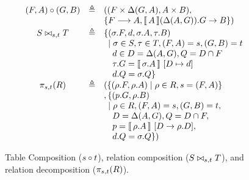 \begin{figure}[tpb]
  \[\begin{array}{ccl}
      \compose{(F,A)}{(G,B)}
      & \triangleq
      & ((F\times\Delta(G,A), A\times B),\\
      &&\{F \longrightarrow A, \bracbb{A}(\Delta(A,G)).G \to B \})\\[.2em]
      \relcomp{s}{t}{S}{T}
      & \triangleq
      & \{(\sigma.F,d,\sigma.A,\tau.B) \\
      && \hspace{.5em}
         \mid \sigma \in S, \tau \in T, (F,A) = s, (G,B) = t \\
      && \hspace{1em}
         d \in D = \Delta(A, G), Q = D \cap F\\
      && \hspace{1em}
         \tau.G = \bracbb{\sigma.A}~[D \mapsto d]\\
      && \hspace{1em}
         d.Q = \sigma.Q
         \}\\        
      \decomp s t R
      & \triangleq
      & (\{(\rho.F,\rho.A) \mid \rho \in R, s = (F,A)\} \\
      && , \{(p.G, \rho.B) \\
      && \hspace{.5em} \mid \rho \in R, (F,A) = s, (G,B) = t, \\
      && \hspace{1em}
         D = \Delta(A,G), Q = D \cap F, \\
      && \hspace{1em}
         p = \bracbb{\rho.A}~[D \to \rho.D],\\
      && \hspace{1em} d.Q = \sigma.Q
         \} )
    \end{array}
  \]  
  \caption{Table Composition ($\compose{s}{t}$), relation
    composition ($\relcomp{s}{t}{S}{T}$), and relation
    decomposition ($\decomp{s}{t}{R}$).}
  \label{fig:compose-tables}
\end{figure}

